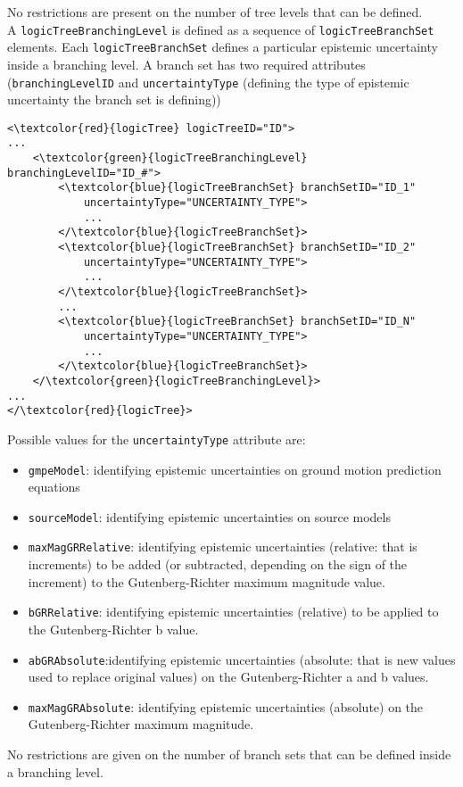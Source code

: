 No restrictions are present on the number of tree levels that can be defined.\\
A \Verb+logicTreeBranchingLevel+ is defined as a sequence of \Verb+logicTreeBranchSet+ elements. Each \Verb+logicTreeBranchSet+ defines a particular epistemic uncertainty inside a branching level. A branch set has two required attributes (\Verb+branchingLevelID+ and \Verb+uncertaintyType+ (defining the type of epistemic uncertainty the branch set is defining))
\begin{Verbatim}[frame=single, commandchars=\\\{\}, samepage=true]
<\textcolor{red}{logicTree} logicTreeID="ID">
...
	<\textcolor{green}{logicTreeBranchingLevel} branchingLevelID="ID_#">
		<\textcolor{blue}{logicTreeBranchSet} branchSetID="ID_1"
			uncertaintyType="UNCERTAINTY_TYPE">
			...
		</\textcolor{blue}{logicTreeBranchSet}>
		<\textcolor{blue}{logicTreeBranchSet} branchSetID="ID_2"
			uncertaintyType="UNCERTAINTY_TYPE">
			...
		</\textcolor{blue}{logicTreeBranchSet}>
		...
		<\textcolor{blue}{logicTreeBranchSet} branchSetID="ID_N"
			uncertaintyType="UNCERTAINTY_TYPE">
			...
		</\textcolor{blue}{logicTreeBranchSet}>
	</\textcolor{green}{logicTreeBranchingLevel}>
...
</\textcolor{red}{logicTree}>
\end{Verbatim}
Possible values for the \Verb+uncertaintyType+ attribute are:
\begin{itemize}
\item \Verb+gmpeModel+: identifying epistemic uncertainties on ground motion prediction equations
\item \Verb+sourceModel+: identifying epistemic uncertainties on source models
\item \Verb+maxMagGRRelative+: identifying epistemic uncertainties (relative: that is increments) to be added (or subtracted, depending on the sign of the increment) to the Gutenberg-Richter maximum magnitude value.
\item \Verb+bGRRelative+: identifying epistemic uncertainties (relative) to be applied to the Gutenberg-Richter b value.
\item \Verb+abGRAbsolute+:identifying epistemic uncertainties (absolute: that is new values used to replace original values) on the Gutenberg-Richter a and b values.
\item \Verb+maxMagGRAbsolute+: identifying epistemic uncertainties (absolute) on the Gutenberg-Richter maximum magnitude.
\end{itemize}
No restrictions are given on the number of branch sets that can be defined inside a branching level.\\
